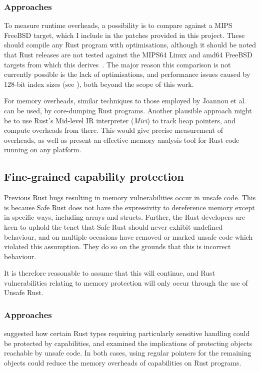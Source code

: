 \documentclass[dissertation.tex]{subfiles}
\begin{document}
\subsubsection{Approaches}
To measure runtime overheads, a possibility is to compare against a MIPS
FreeBSD target, which I include in the patches provided in this project.
These should compile any Rust program with optimisations, although it
should be noted that Rust releases are not tested against the MIPS64
Linux and amd64 FreeBSD targets from which this
derives~\cite{rust-platform-support}.
The major reason this comparison is not currently possible is the lack
of optimisations, and performance issues caused by 128-bit index sizes
(see ), both beyond the scope of this work.

For memory overheads, similar techniques to those employed by Joannou et
al.\ \cite{cheri-tagged-memory} can be used, by core-dumping Rust
programs.
Another plausible approach might be to use Rust's Mid-level IR
interpreter (\emph{Miri}) to track heap pointers, and compute overheads
from there.
This would give precise measurement of overheads, as well as present an
effective memory analysis tool for Rust code running on any platform.


\subsection{Fine-grained capability protection}

Previous Rust bugs resulting in memory vulnerabilities occur in unsafe
code.
This is because Safe Rust does not have the expressivity to dereference
memory except in specific ways, including arrays and structs.
Further, the Rust developers are keen to uphold the tenet that Safe Rust
should never exhibit undefined behaviour, and on multiple occasions have
removed or marked unsafe code which violated this assumption.
They do so on the grounds that this is incorrect behaviour.

It is therefore reasonable to assume that this will continue, and Rust
vulnerabilities relating to memory protection will only occur through
the use of Unsafe Rust.

\subsubsection{Approaches}
 suggested how certain Rust types
requiring particularly sensitive handling could be protected by
capabilities, and  examined the implications of
protecting objects reachable by unsafe code.
In both cases, using regular pointers for the remaining objects could
reduce the memory overheads of capabilities on Rust programs.
\end{document}
